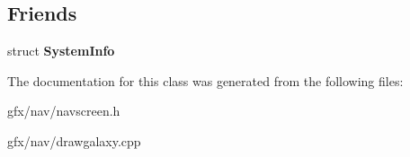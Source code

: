 \subsection*{Friends}
\begin{DoxyCompactItemize}
\item 
struct {\bfseries System\+Info}\hypertarget{classNavigationSystem_1_1CachedSystemIterator_abb6a0ce9d3dc81a0025e9fa2f22ed5e7}{}\label{classNavigationSystem_1_1CachedSystemIterator_abb6a0ce9d3dc81a0025e9fa2f22ed5e7}

\end{DoxyCompactItemize}


The documentation for this class was generated from the following files\+:\begin{DoxyCompactItemize}
\item 
gfx/nav/navscreen.\+h\item 
gfx/nav/drawgalaxy.\+cpp\end{DoxyCompactItemize}
